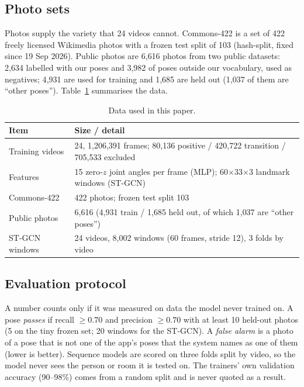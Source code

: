 \subsection{Photo sets}
Photos supply the variety that 24 videos cannot. Commons-422 is a set of 422 freely licensed Wikimedia photos with a frozen test split of 103 (hash-split, fixed since 19 Sep 2026). Public photos are 6{,}616 photos from two public datasets: 2{,}634 labelled with our poses and 3{,}982 of poses outside our vocabulary, used as negatives; 4{,}931 are used for training and 1{,}685 are held out (1{,}037 of them are ``other poses''). Table~\ref{tab:data} summarises the data.
\begin{table}[t]
\centering\footnotesize
\caption{Data used in this paper.}\label{tab:data}
\begin{tabularx}{\columnwidth}{@{}lX@{}}
\toprule
Item & Size / detail \\ \midrule
Training videos & 24, 1{,}206{,}391 frames; 80{,}136 positive / 420{,}722 transition / 705{,}533 excluded \\
Features & 15 zero-$z$ joint angles per frame (MLP); 60$\times$33$\times$3 landmark windows (ST-GCN) \\
Commons-422 & 422 photos; frozen test split 103 \\
Public photos & 6{,}616 (4{,}931 train / 1{,}685 held out, of which 1{,}037 are ``other poses'') \\
ST-GCN windows & 24 videos, 8{,}002 windows (60 frames, stride 12), 3 folds by video \\ \bottomrule
\end{tabularx}
\end{table}

\subsection{Evaluation protocol}
A number counts only if it was measured on data the model never trained on. A pose \emph{passes} if recall $\ge0.70$ and precision $\ge0.70$ with at least 10 held-out photos (5 on the tiny frozen set; 20 windows for the ST-GCN). A \emph{false alarm} is a photo of a pose that is not one of the app's poses that the system names as one of them (lower is better). Sequence models are scored on three folds split by video, so the model never sees the person or room it is tested on. The trainers' own validation accuracy (90--98\%) comes from a random split and is never quoted as a result.
